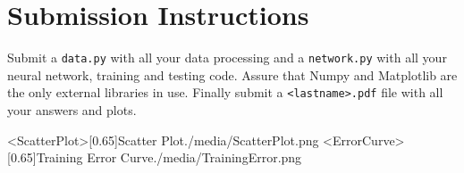 \documentclass{homework}
\begin{document}
\section*{Submission Instructions}
	Submit a \texttt{data.py} with all your data processing and a \texttt{network.py} with all your neural network, training and testing code. Assure that Numpy and Matplotlib are the only external libraries in use. Finally submit a \texttt{<lastname>.pdf} file with all your answers and plots.

\img<ScatterPlot>[0.65]{Scatter Plot}{./media/ScatterPlot.png}
\img<ErrorCurve>[0.65]{Training Error Curve}{./media/TrainingError.png}
\end{document}
